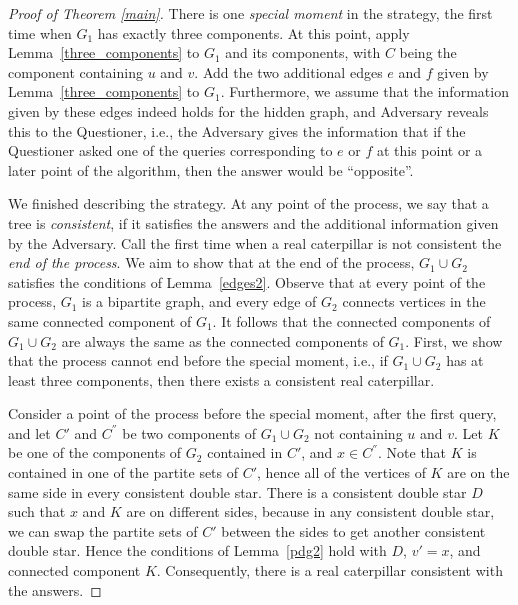 \documentclass[12pt,a4paper]{amsart}
\theoremstyle{plain}
\theoremstyle{definition}
\begin{document}
\begin{proof}[Proof of Theorem \ref{main}]
    There is one \emph{special moment} in the strategy, the first time when $G_1$ has exactly three components. At this point, apply Lemma~\ref{three_components} to $G_1$ and its components, with $C$ being the component containing $u$ and $v$. Add the two additional edges $e$ and $f$ given by Lemma~\ref{three_components} to $G_1$. Furthermore, we assume that the information given by these edges indeed holds for the hidden graph, and Adversary reveals this to the Questioner, i.e., the Adversary gives the information that if the Questioner asked one of the queries corresponding to $e$ or $f$ at this point or a later point of the algorithm, then the answer would be ``opposite''. 

    We finished describing the strategy. At any point of the process, we say that a tree is \emph{consistent}, if it satisfies the answers and the additional information given by the Adversary. Call the first time when a real caterpillar is not consistent the \emph{end of the process}. We aim to show that at the end of the process, $G_1 \cup G_2$ satisfies the conditions of Lemma~\ref{edges2}.
    Observe that at every point of the process, $G_1$ is a bipartite graph, and every edge of $G_2$ connects vertices in the same connected component of $G_1$. It follows that the connected components of $G_1 \cup G_2$ are always the same as the connected components of $G_1$. First, we show that the process cannot end before the special moment, i.e., if $G_1 \cup G_2$ has at least three components, then there exists a consistent real caterpillar.

    Consider a point of the process before the special moment, after the first query, and let $C'$ and $C^{''}$ be two components of $G_1 \cup G_2$ not containing $u$ and $v$. Let $K$ be one of the components of $G_2$ contained in $C'$, and $x \in C^{''}$. Note that $K$ is contained in one of the partite sets of $C'$, hence all of the vertices of $K$ are on the same side in every consistent double star. There is a consistent double star $D$ such that $x$ and $K$ are on different sides, because in any consistent double star, we can swap the partite sets of $C'$ between the sides to get another consistent double star. Hence the conditions of Lemma~\ref{pdg2} hold with $D$, $v'=x$, and connected component $K$. Consequently, there is a real caterpillar consistent with the answers.


\end{proof}
\end{document}
